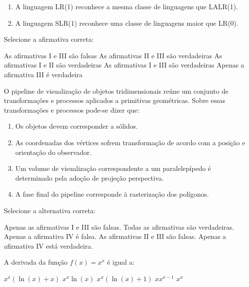 \documentclass[12pt, addpoints]{exam}
\begin{document}
\begin{questions}
\begin{enumerate}[label=\Roman*.]
    \item A linguagem LR(1) reconhece a mesma classe de linguagens que LALR(1).

    \item A linguagem SLR(1) reconhece uma classe de linguagens maior que LR(0).

\end{enumerate}

Selecione a afirmativa correta:
\begin{choices}
\choice As afirmativas I e III são falsas
\choice As afirmativas II e III são verdadeiras
\choice As afirmativas I e II são verdadeiras
\choice As afirmativas I e III são verdadeiras
\choice Apenas a afirmativa III é verdadeira
\end{choices}

\question

O pipeline de visualização de objetos tridimensionais reúne um conjunto de transformações e processos aplicados a primitivas geométricas. Sobre essas transformações e processos pode-se dizer que:

\begin{enumerate}[label=\Roman*.]

    \item Os objetos devem corresponder a sólidos.

    \item As coordenadas dos vértices sofrem transformação de acordo com a posição e orientação do observador.

    \item Um volume de visualização correspondente a um paralelepípedo é determinado pela adoção de projeção perspectiva.

    \item A fase final do pipeline corresponde à rasterização dos polígonos.

\end{enumerate}

Selecione a alternativa correta:
\begin{choices}
\choice Apenas as afirmativas I e III são falsas.
\choice Todas as afirmativas são verdadeiras.
\choice Apenas a afirmativa IV é falsa.
\choice As afirmativas II e III são falsas.
\choice Apenas a afirmativa IV está verdadeira.
\end{choices}

\question

A derivada da função \( f(x) = x^x \) é igual a:
\begin{choices}
\choice \( x^x (\ln(x) + x) \)
\choice \( x^x \ln(x) \)
\choice \( x^x (\ln(x) + 1) \)
\choice \( x x^{x-1} \)
\choice \( x^x \)
\end{choices}


\end{questions}
\end{document}
